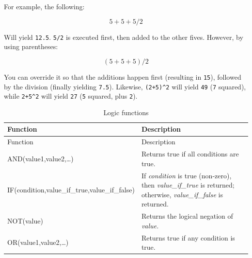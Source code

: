 \documentclass[
]{book}
\theoremstyle{definition}
\theoremstyle{definition}
\theoremstyle{definition}
\theoremstyle{definition}
\theoremstyle{remark}
\begin{document}
For example, the following:

\[
5+5+5/2
\]

Will yield \texttt{12.5}. \texttt{5/2} is executed first, then added to the other fives. However, by using parentheses:

\[
(5+5+5)/2
\]

You can override it so that the additions happen first (resulting in \texttt{15}), followed by the division (finally yielding \texttt{7.5}). Likewise, \texttt{(2+5)\^{}2} will yield \texttt{49} (\texttt{7} squared), while \texttt{2+5\^{}2} will yield \texttt{27} (\texttt{5} squared, plus \texttt{2}).

\begin{minipage}{\textwidth}

\begin{longtable}[]{@{}
  >{\raggedright\arraybackslash}p{}
  >{\raggedright\arraybackslash}p{}@{}}
\caption{Logic functions}\tabularnewline
\toprule
Function & Description \\
\midrule
\endfirsthead
\toprule
Function & Description \\
\midrule
\endhead
AND(value1,value2,\ldots) & Returns true if all conditions are true. \\
IF(condition,value\_if\_true,value\_if\_false) & If \emph{condition} is true (non-zero), then \emph{value\_if\_true} is returned; otherwise, \emph{value\_if\_false} is returned. \\
NOT(value) & Returns the logical negation of \emph{value.} \\
OR(value1,value2,\ldots) & Returns true if any condition is true. \\
\bottomrule
\end{longtable}

\end{minipage}
\end{document}
